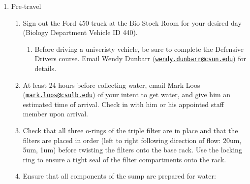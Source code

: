 \documentclass[]{book}
\providecommand{\tightlist}{%
  \setlength{\itemsep}{0pt}\setlength{\parskip}{0pt}}
\begin{document}
\begin{enumerate}
\def\labelenumi{\arabic{enumi}.}
\tightlist
\item
  Pre-travel

  \begin{enumerate}
  \def\labelenumii{\arabic{enumii}.}
  \tightlist
  \item
    Sign out the Ford 450 truck at the Bio Stock Room for your desired
    day (Biology Department Vehicle ID 440).

    \begin{enumerate}
    \def\labelenumiii{\arabic{enumiii}.}
    \tightlist
    \item
      Before driving a univeristy vehicle, be sure to complete the
      Defensive Drivers course. Email Wendy Dunbarr
      (\href{mailto:wendy.dunbarr@csun.edu}{\nolinkurl{wendy.dunbarr@csun.edu}})
      for details.
    \end{enumerate}
  \item
    At least 24 hours before collecting water, email Mark Loos
    (\href{mailto:mark.loos@csulb.edu}{\nolinkurl{mark.loos@csulb.edu}})
    of your intent to get water, and give him an estimated time of
    arrival. Check in with him or his appointed staff member upon
    arrival.
  \item
    Check that all three o-rings of the triple filter are in place and
    that the filters are placed in order (left to right following
    direction of flow: 20um, 5um, 1um) before twisting the filters onto
    the base rack. Use the locking ring to ensure a tight seal of the
    filter compartments onto the rack.
  \item
    Ensure that all components of the sump are prepared for water:


\end{enumerate}
\end{enumerate}
\end{document}
